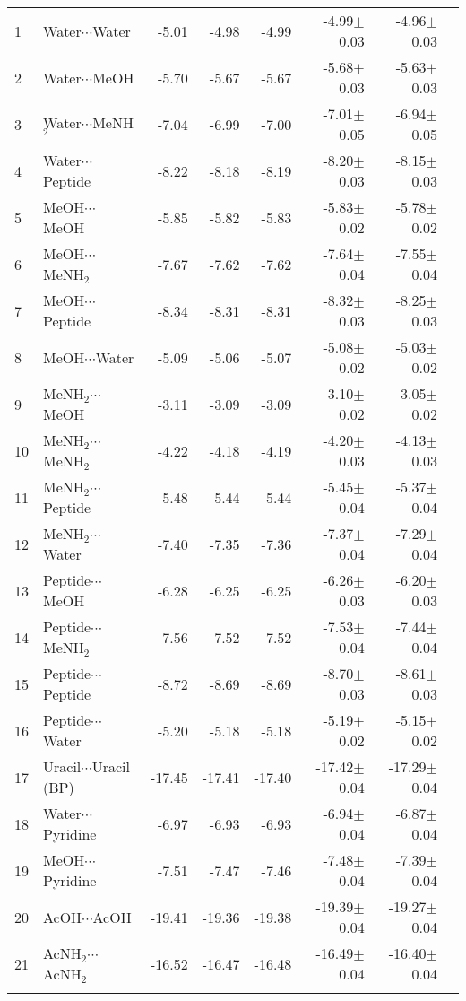 \begin{longtable}{llrrrrrr}
1 & Water$\cdots$Water & -5.01 & -4.98 & -4.99 & -4.99$\pm$0.03 & -4.96$\pm$0.03 \\
2 & Water$\cdots$MeOH & -5.70 & -5.67 & -5.67 & -5.68$\pm$0.03 & -5.63$\pm$0.03 \\
3 & Water$\cdots$MeNH$_2$ & -7.04 & -6.99 & -7.00 & -7.01$\pm$0.05 & -6.94$\pm$0.05 \\
4 & Water$\cdots$Peptide & -8.22 & -8.18 & -8.19 & -8.20$\pm$0.03 & -8.15$\pm$0.03 \\
5 & MeOH$\cdots$MeOH & -5.85 & -5.82 & -5.83 & -5.83$\pm$0.02 & -5.78$\pm$0.02 \\
6 & MeOH$\cdots$MeNH$_2$ & -7.67 & -7.62 & -7.62 & -7.64$\pm$0.04 & -7.55$\pm$0.04 \\
7 & MeOH$\cdots$Peptide & -8.34 & -8.31 & -8.31 & -8.32$\pm$0.03 & -8.25$\pm$0.03 \\
8 & MeOH$\cdots$Water & -5.09 & -5.06 & -5.07 & -5.08$\pm$0.02 & -5.03$\pm$0.02 \\
9 & MeNH$_2$$\cdots$MeOH & -3.11 & -3.09 & -3.09 & -3.10$\pm$0.02 & -3.05$\pm$0.02 \\
10 & MeNH$_2$$\cdots$MeNH$_2$ & -4.22 & -4.18 & -4.19 & -4.20$\pm$0.03 & -4.13$\pm$0.03 \\
11 & MeNH$_2$$\cdots$Peptide & -5.48 & -5.44 & -5.44 & -5.45$\pm$0.04 & -5.37$\pm$0.04 \\
12 & MeNH$_2$$\cdots$Water & -7.40 & -7.35 & -7.36 & -7.37$\pm$0.04 & -7.29$\pm$0.04 \\
13 & Peptide$\cdots$MeOH & -6.28 & -6.25 & -6.25 & -6.26$\pm$0.03 & -6.20$\pm$0.03 \\
14 & Peptide$\cdots$MeNH$_2$ & -7.56 & -7.52 & -7.52 & -7.53$\pm$0.04 & -7.44$\pm$0.04 \\
15 & Peptide$\cdots$Peptide & -8.72 & -8.69 & -8.69 & -8.70$\pm$0.03 & -8.61$\pm$0.03 \\
16 & Peptide$\cdots$Water & -5.20 & -5.18 & -5.18 & -5.19$\pm$0.02 & -5.15$\pm$0.02 \\
17 & Uracil$\cdots$Uracil (BP) & -17.45 & -17.41 & -17.40 & -17.42$\pm$0.04 & -17.29$\pm$0.04 \\
18 & Water$\cdots$Pyridine & -6.97 & -6.93 & -6.93 & -6.94$\pm$0.04 & -6.87$\pm$0.04 \\
19 & MeOH$\cdots$Pyridine & -7.51 & -7.47 & -7.46 & -7.48$\pm$0.04 & -7.39$\pm$0.04 \\
20 & AcOH$\cdots$AcOH & -19.41 & -19.36 & -19.38 & -19.39$\pm$0.04 & -19.27$\pm$0.04 \\
21 & AcNH$_2$$\cdots$AcNH$_2$ & -16.52 & -16.47 & -16.48 & -16.49$\pm$0.04 & -16.40$\pm$0.04 \\
$$
\end{longtable}
